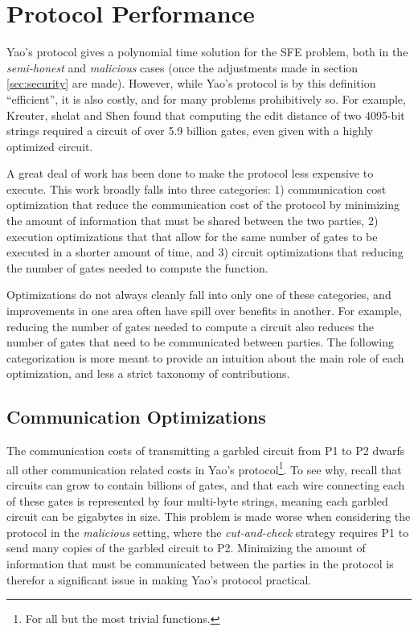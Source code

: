 \section{Protocol Performance}
\label{sec:performance}

Yao's protocol gives a polynomial time solution for the \ac{SFE} problem, both in the \emph{semi-honest} and \emph{malicious} cases (once the adjustments made in section \ref{sec:security} are made).  However, while Yao's protocol is by this definition ``efficient'', it is also costly, and for many problems prohibitively so.  For example, Kreuter, shelat and Shen\cite{kreuter2012billion} found that computing the edit distance of two 4095-bit strings required a circuit of over 5.9 billion gates, even given with a highly optimized circuit.

A great deal of work has been done to make the protocol less expensive to execute.  This work broadly falls into three categories: 1) communication cost optimization that reduce the communication cost of the protocol by minimizing the amount of information that must be shared between the two parties, 2) execution optimizations that that allow for the same number of gates to be executed in a shorter amount of time, and 3) circuit optimizations that reducing the number of gates needed to compute the function.

Optimizations do not always cleanly fall into only one of these categories, and improvements in one area often have spill over benefits in another.  For example, reducing the number of gates needed to compute a circuit also reduces the number of gates that need to be communicated between parties.  The following categorization is more meant to provide an intuition about the main role of each optimization, and less a strict taxonomy of contributions.


\subsection{Communication Optimizations}

The communication costs of transmitting a garbled circuit from \ac{P1} to \ac{P2} dwarfs all other communication related costs in Yao's protocol\footnote{For all but the most trivial functions.}.  To see why, recall that circuits can grow to contain billions of gates, and that each wire connecting each of these gates is represented by four multi-byte strings, meaning each garbled circuit can be gigabytes in size. This problem is made worse when considering the protocol in the \emph{malicious} setting, where the \emph{cut-and-check} strategy requires \ac{P1} to send many copies of the garbled circuit to \ac{P2}. Minimizing the amount of information that must be communicated between the parties in the protocol is therefor a significant issue in making Yao's protocol practical.

